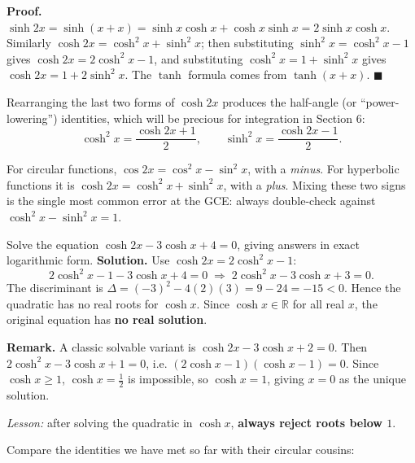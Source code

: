 \documentclass[11pt]{article}
\newcommand{\cle}[1]{{\popxbold\color{popdark}#1}}
\newcounter{popsec}
\newcounter{popsub}
\newcommand{\courssub}[1]{%
  \stepcounter{popsub}%
  \par\vspace{9pt}\noindent{\popxbold\fontsize{11.5}{13}\selectfont\color{popink}{\color{poporange}\thepopsec.\thepopsub}\hspace{6pt}#1}\par\nopagebreak\vspace{4pt}
}
\begin{document}
\textbf{Proof.} $\sinh 2x=\sinh(x+x)=\sinh x\cosh x+\cosh x\sinh x=2\sinh x\cosh x$. Similarly $\cosh 2x=\cosh^{2}x+\sinh^{2}x$; then substituting $\sinh^{2}x=\cosh^{2}x-1$ gives $\cosh 2x=2\cosh^{2}x-1$, and substituting $\cosh^{2}x=1+\sinh^{2}x$ gives $\cosh 2x=1+2\sinh^{2}x$. The $\tanh$ formula comes from $\tanh(x+x)$. $\blacksquare$

Rearranging the last two forms of $\cosh 2x$ produces the \cle{half-angle} (or ``power-lowering'') identities, which will be precious for integration in Section 6:
\[
\cosh^{2}x=\frac{\cosh 2x+1}{2},\qquad \sinh^{2}x=\frac{\cosh 2x-1}{2}.
\]

\begin{attention}
For circular functions, $\cos 2x=\cos^{2}x-\sin^{2}x$, with a \emph{minus}. For hyperbolic functions it is $\cosh 2x=\cosh^{2}x\,\mathbf{+}\,\sinh^{2}x$, with a \emph{plus}. Mixing these two signs is the single most common error at the GCE: always double-check against $\cosh^{2}x-\sinh^{2}x=1$.
\end{attention}

\begin{exoresolu}
Solve the equation $\cosh 2x-3\cosh x+4=0$, giving answers in exact logarithmic form.
\tcblower
\textbf{Solution.} Use $\cosh 2x=2\cosh^{2}x-1$:
\[
2\cosh^{2}x-1-3\cosh x+4=0
\;\Longrightarrow\;
2\cosh^{2}x-3\cosh x+3=0.
\]
The discriminant is $\Delta = (-3)^{2}-4(2)(3)=9-24=-15<0$. Hence the quadratic has no real roots for $\cosh x$. Since $\cosh x \in \mathbb{R}$ for all real $x$, the original equation has \textbf{no real solution}.

\textbf{Remark.} A classic solvable variant is $\cosh 2x-3\cosh x+2=0$. Then $2\cosh^{2}x-3\cosh x+1=0$, i.e. $(2\cosh x-1)(\cosh x-1)=0$. Since $\cosh x\ge 1$, $\cosh x=\frac12$ is impossible, so $\cosh x=1$, giving $x=0$ as the unique solution.

\emph{Lesson:} after solving the quadratic in $\cosh x$, \textbf{always reject roots below $1$}.
\end{exoresolu}

\courssub{Osborn's rule}

Compare the identities we have met so far with their circular cousins:
\end{document}
